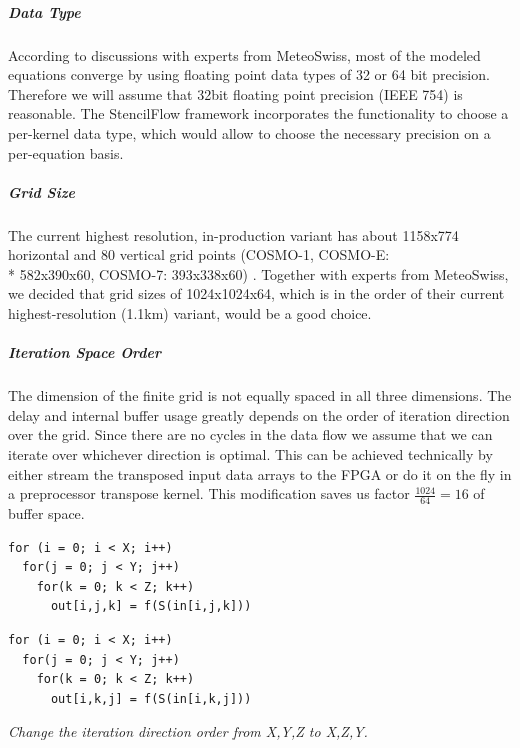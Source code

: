 \subparagraph{Data Type}
According to discussions with experts from MeteoSwiss, most of the modeled equations converge by using floating point data types of 32 or 64 bit precision. Therefore we will assume that 32bit floating point precision (IEEE 754) is reasonable. The StencilFlow framework incorporates the functionality to choose a per-kernel data type, which would allow to choose the necessary precision on a per-equation basis. 

\subparagraph{Grid Size}
The current highest resolution, in-production variant has about 1158x774 horizontal and 80 vertical grid points (COSMO-1, COSMO-E: \\* 582x390x60, COSMO-7: 393x338x60) \cite{label51}. Together with experts from MeteoSwiss, we decided that grid sizes of 1024x1024x64, which is in the order of their current highest-resolution (1.1km) variant, would be a good choice.



\subparagraph{Iteration Space Order}
The dimension of the finite grid is not equally spaced in all three dimensions. The delay and internal buffer usage greatly depends on the order of iteration direction over the grid. Since there are no cycles in the data flow we assume that we can iterate over whichever direction is optimal. This can be achieved technically by either stream the transposed input data arrays to the FPGA or do it on the fly in a preprocessor transpose kernel. This modification saves us factor $\frac{1024}{64} = 16$ of buffer space.
\begin{verbatim}
for (i = 0; i < X; i++)
  for(j = 0; j < Y; j++)
    for(k = 0; k < Z; k++)
      out[i,j,k] = f(S(in[i,j,k]))
\end{verbatim}
\begin{verbatim}
for (i = 0; i < X; i++)
  for(j = 0; j < Y; j++)
    for(k = 0; k < Z; k++)
      out[i,k,j] = f(S(in[i,k,j]))
\end{verbatim}
\textit{Change the iteration direction order from X,Y,Z to X,Z,Y.}

